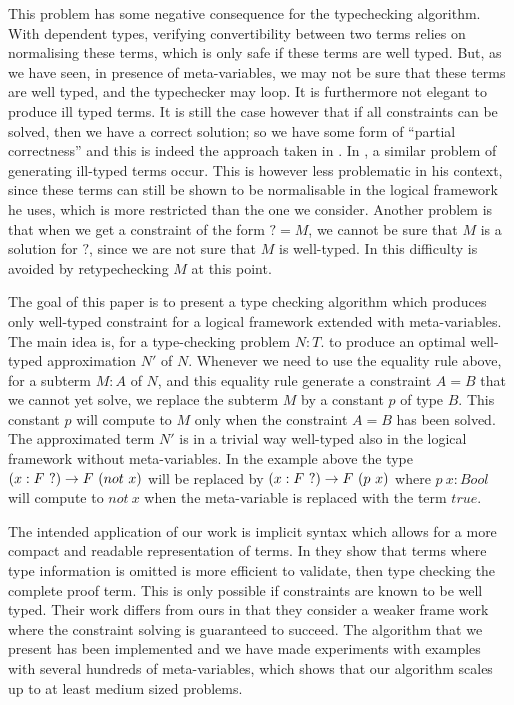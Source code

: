 This problem has some negative consequence for the typechecking algorithm. With dependent types,
verifying convertibility between two 
terms relies on normalising these terms, which is only safe if these terms are well typed. But, as we
have seen, in presence of meta-variables, we may not be sure that these terms are well typed, and the
typechecker may loop. It is furthermore not elegant to produce ill typed terms.
It is still the case however that if all constraints can be solved, then we have a correct solution; so we
have some form of ``partial correctness'' and this is indeed the approach taken in 
\cite{magnussonnordstrom:alf,coquand:stt-lfm99}. In \cite{elliot:unification}, a similar problem of generating
ill-typed terms occur. This is however less problematic in his context, since these terms can still be shown
to be normalisable in the logical framework he uses, which is more restricted than the one we consider.
Another problem is that when we get a constraint of the form $? = M$, we cannot be sure that $M$ is a solution
for $?$, since we are not sure that $M$ is well-typed. In \cite{magnussonnordstrom:alf,coquand:stt-lfm99}
this difficulty is avoided by retypechecking $M$ at this point. 


 The goal of this paper is to present a type checking algorithm which produces only well-typed constraint  for a logical framework extended with meta-variables. The main idea is,
for a type-checking problem $N:T$.
to produce an optimal well-typed approximation $N'$ of $N$. 
Whenever we need to use the equality rule above, for a subterm $M:A$ of $N$, and this
equality rule generate a constraint $A=B$ that we cannot yet solve, we replace the subterm $M$
by a constant $p$ of type $B$. This constant $p$ will compute to $M$ only when the
constraint $A=B$ has been solved. The approximated term $N'$ is in a trivial way well-typed
also in the logical framework without meta-variables. In the example above the type $(x:F ~?)\to{} {F~ (not~x)}$ will be replaced by $(x:F ~?)\to{} {F~ (p ~ x)}$ where $p~x : Bool$ will compute to $not ~ x$ when the meta-variable is
replaced with the term $true$.


The intended application of our work is implicit syntax which allows for a more compact
and readable representation of terms. In \cite{necula:representation} they show that 
terms where type information is omitted is  more efficient to validate, then type checking the complete
proof term. This is only possible if constraints are known to be well typed. Their work differs from ours in 
that they consider a weaker frame work where the constraint solving is guaranteed to succeed.
The algorithm that we present has been implemented and we have made experiments with examples with several hundreds of meta-variables, which shows that our algorithm scales up to at least medium sized problems.


